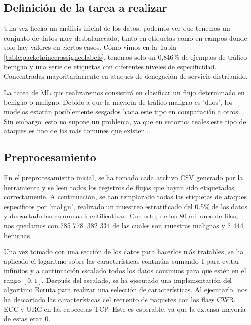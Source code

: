 \color{blue} %
\subsection{Definición de la tarea a realizar}

Una vez hecho un análisis inicial de los datos, podemos ver que tenemos un conjunto de datos muy desbalanceado, tanto en etiquetas como en campos donde solo hay valores en ciertos casos. Como vimos en la Tabla \ref{table:packetpincerassignedlabels}, tenemos solo un 0,846\% de ejemplos de tráfico benigno y una serie de etiquetas con diferentes niveles de especificidad. Concentradas mayoritariamente en ataques de denegación de servicio distribuido. 

La tarea de ML que realizaremos consistirá en clasificar un flujo determinado en benigno o maligno. Debido a que la mayoría de tráfico maligno es 'ddos', los modelos estarán posiblemente sesgados hacia este tipo en comparación a otros. Sin embargo, esto no supone un problema, ya que en entornos reales este tipo de ataques es uno de los más comunes que existen \cite{topciberattacks}.

\subsection{Preprocesamiento}

En el preprocesamiento inicial, se ha tomado cada archivo CSV generado por la herramienta y se leen todos los registros de flujos que hayan sido etiquetados correctamente. A continuación, se han remplazado todas las etiquetas de ataques específicos por 'malign', realizado un muestreo estratificado del 0.5\% de los datos y descartado las columnas identificativas. Con esto, de los 80 millones de filas, nos quedamos con 385 778, 382 334 de las cuales son muestras malignas y 3 444 benignas.

Una vez tomado con una sección de los datos para hacerlos más tratables, se ha aplicado el logaritmo sobre las características continúas sumando 1 para evitar infinitos y a continuación escalado todos los datos continuos para que estén en el rango $[0, 1]$. Después del escalado, se ha ejecutado una implementación del algoritmo Boruta \cite{borutapy} para realizar una selección de características. Al ejecutarlo, nos ha descartado las características del recuento de paquetes con los flags CWR, ECC y URG en las cabeceras TCP. Esto es esperable, ya que la extensa mayoría de estas eran 0.

